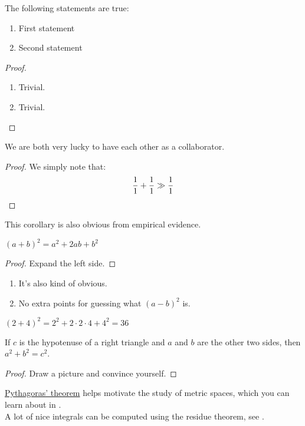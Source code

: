 \begin{verbatim*}
\begin{theorem}
The following statements are true:
\begin{enumerate}
    \item First statement
    \item Second statement
\end{enumerate}
\end{theorem}
\begin{proof}% For some reason, the proof environment does not need \leavevmode
\begin{enumerate}
    \item Trivial.
    \item Trivial.\qedhere % qedhere is to place the qed symbol here instead of in the next line
\end{enumerate}
\end{proof}

\begin{corollary}
We are both very lucky to have each other as a collaborator.
\end{corollary}
\begin{proof}
We simply note that:
\begin{equation*}
    \frac{1}{1}+\frac{1}{1}\gg\frac{1}{1} \qedhere
\end{equation*}
\end{proof}
\begin{remark}
This corollary is also obvious from empirical evidence.
\end{remark}

\begin{lemma}
$(a+b)^2=a^2+2ab+b^2$
\end{lemma}
\begin{proof}
Expand the left side.
\end{proof}
\begin{remarks}\leavevmode
\begin{enumerate}
    \item It's also kind of obvious.
    \item No extra points for guessing what $(a-b)^2$ is.
\end{enumerate}
\end{remarks}

\begin{example}
$(2+4)^2=2^2+2\cdot 2\cdot 4+4^2=36$
\end{example}

\begin{theorem}\label{pythagoras}
If $c$ is the hypotenuse of a right triangle and $a$ and $b$ are the other two sides, then $a^2+b^2=c^2$.
\end{theorem}
\begin{proof}
Draw a picture and convince yourself.
\end{proof}

\hyperref[pythagoras]{Pythagoras' theorem} helps motivate the study of metric spaces, which you can learn about in \cite{sekhon}.\\

A lot of nice integrals can be computed using the residue theorem, see \cite[Section 5.2]{taylor}.
\end{verbatim*}
